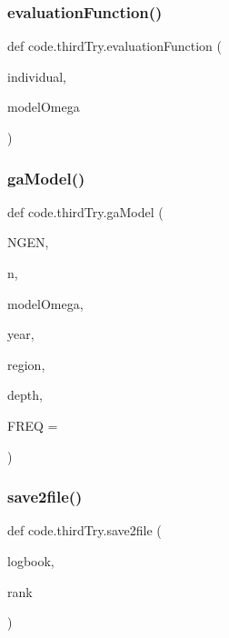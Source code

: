 \subsubsection{\texorpdfstring{evaluation\+Function()}{evaluationFunction()}}
{\footnotesize\ttfamily def code.\+third\+Try.\+evaluation\+Function (\begin{DoxyParamCaption}\item[{}]{individual,  }\item[{}]{model\+Omega }\end{DoxyParamCaption})}

\mbox{\label{namespacecode_1_1third_try_af5f0d516268ea4b8717680aff6e9f789}} 
\subsubsection{\texorpdfstring{ga\+Model()}{gaModel()}}
{\footnotesize\ttfamily def code.\+third\+Try.\+ga\+Model (\begin{DoxyParamCaption}\item[{}]{N\+G\+EN,  }\item[{}]{n,  }\item[{}]{model\+Omega,  }\item[{}]{year,  }\item[{}]{region,  }\item[{}]{depth,  }\item[{}]{F\+R\+EQ = {} }\end{DoxyParamCaption})}

\mbox{\label{namespacecode_1_1third_try_aa9164c597206c52dca18c340eba9f33f}} 
\subsubsection{\texorpdfstring{save2file()}{save2file()}}
{\footnotesize\ttfamily def code.\+third\+Try.\+save2file (\begin{DoxyParamCaption}\item[{}]{logbook,  }\item[{}]{rank }\end{DoxyParamCaption})}



